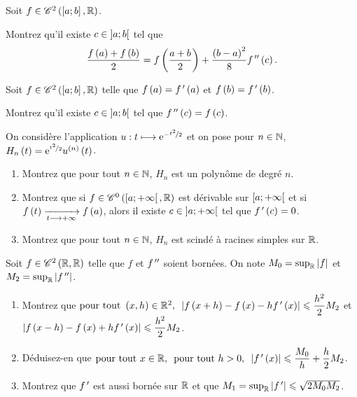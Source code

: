 \begin{exosss}
Soit \(f\in\mathscr{C}^{2}\left(\left[a;b\right],\mathbb{R}\right)\).

Montrez qu'il existe \(c\in\left]a;b\right[\) tel que \[\dfrac{f\left(a\right)+f\left(b\right)}{2}=f\left(\dfrac{a+b}{2}\right)+\dfrac{\left(b-a\right)^2}{8}f^{\,\prime\prime}\left(c\right).\]
\end{exosss}

\begin{exosss}
Soit \(f\in\mathscr{C}^{2}\left(\left[a;b\right],\mathbb{R}\right)\) telle que \(f\left(a\right)=f^{\,\prime}\left(a\right)\) et \(f\left(b\right)=f^{\,\prime}\left(b\right)\).

Montrez qu'il existe \(c\in\left]a;b\right[\) tel que \(f^{\,\prime\prime}\left(c\right)=f\left(c\right)\).
\end{exosss}

\begin{exoss}
On considère l'application \(u:t\longmapsto\mathrm{e}^{-\nicefrac{t^2}{2}}\) et on pose pour \(n\in\mathbb{N}\), \(H_n\left(t\right)=\mathrm{e}^{\nicefrac{t^2}{2}}u^{\left(n\right)}\left(t\right)\).

\begin{enumerate}
    \item Montrez que pour tout \(n\in\mathbb{N}\), \(H_n\) est un polynôme de degré \(n\). \\
    \item Montrez que si \(f\in\mathscr{C}^{0}\left(\left[a;+\infty\right[,\mathbb{R}\right)\) est dérivable sur \(\left[a;+\infty\right[\) et si \(f\left(t\right)\xrightarrow[t\longrightarrow+\infty]{}f\left(a\right)\), alors il existe \(c\in\left]a;+\infty\right[\) tel que \(f^{\,\prime}\left(c\right)=0\). \\
    \item Montrez que pour tout \(n\in\mathbb{N}\), \(H_n\) est scindé à racines simples sur \(\mathbb{R}\).
\end{enumerate}
\end{exoss}

\begin{exoss}
Soit \(f\in\mathscr{C}^{2}\left(\mathbb{R},\mathbb{R}\right)\) telle que \(f\) et \(f^{\,\prime\prime}\) soient bornées. On note \(M_0=\sup_{\mathbb{R}}\left\lvert f\right\rvert\) et \(M_2=\sup_{\mathbb{R}}\left\lvert f^{\,\prime\prime}\right\rvert\).

\begin{enumerate}
    \item Montrez que \(\quantifs{\tpt\paren{x,h}\in\R^2}\abs{f\paren{x+h}-f\paren{x}-hf\prim\paren{x}}\leq\dfrac{h^2}{2}M_2\) et \\ \(\left\lvert f\left(x-h\right)-f\left(x\right)+hf^{\,\prime}\left(x\right)\right\rvert\leqslant\dfrac{h^2}{2}M_2\). \\
    \item Déduisez-en que \(\quantifs{\tpt x\in\R;\tpt h>0}\abs{f\prim\paren{x}}\leq\dfrac{M_0}{h}+\dfrac{h}{2}M_2\). \\
    \item Montrez que \(f^{\,\prime}\) est aussi bornée sur \(\mathbb{R}\) et que \(M_1=\sup_{\mathbb{R}}\left\lvert f^{\,\prime}\right\rvert\leqslant\sqrt{2M_0M_2}\).
\end{enumerate}
\end{exoss}

